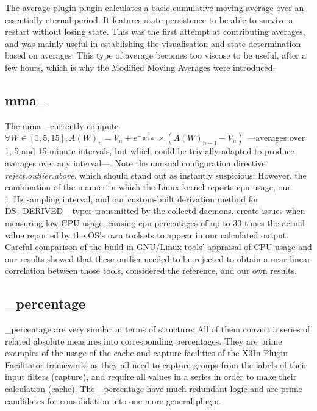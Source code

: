 The average plugin  plugin calculates a basic cumulative moving average
over an essentially eternal period. It features state persistence
to be able to survive a restart without losing state. This was
the first attempt at contributing averages, and was mainly useful
in establishing the visualisation and state determination based on
averages. This type of average becomes too viscose to be useful, after
a few hours, which is why the Modified Moving Averages \witches{} were
introduced.

\subsection{mma\_ \witches{}}

The mma\_ \witches{} currently compute $\forall{}W\in{}[1,5,15], A(W)_n =
V_n + e^{-\frac{1}{W\times60}} \times ( A(W)_{n-1} - V_n )$ ---averages
over 1, 5 and 15-minute intervals, but which could be trivially adapted
to produce averages over any interval---. Note the unusual configuration
directive \emph{reject.outlier.above}, which should stand out as instantly
suspicious: However, the combination of the manner in which the Linux
kernel reports cpu usage, our \SI{1}{\hertz} sampling interval, and our
custom-built derivation method for DS\_DERIVED\_ types transmitted by
the collectd daemons, create issues when measuring low CPU usage, causing
cpu percentages of up to 30 times the actual value reported by the OS's
own toolsets to appear in our calculated output.  Careful comparison
of the build-in GNU/Linux tools' appraisal of CPU usage and our results
showed that these outlier needed to be rejected to obtain a near-linear
correlation between those tools, considered the reference, and our own
results. 

\subsection{\_percentage \witches{}}

\_percentage \witches{} are very similar in terms of structure: All of
them convert a series of related absolute measures into corresponding
percentages. They are prime examples of the usage of the cache and capture
facilities of the X3In Plugin Facilitator framework, as they all need
to capture groups from the labels of their input filters (capture),
and require all values in a series in order to make their calculation
(cache). The \_percentage \witches{} have much redundant logic and are
prime candidates for consolidation into one more general plugin.

